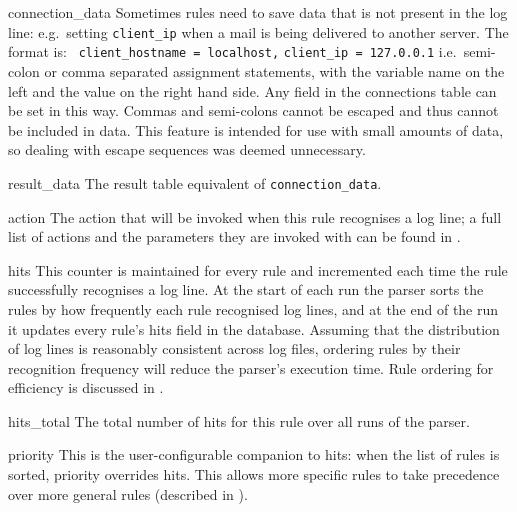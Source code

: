 \begin{boldeqlist}
    \item [connection\_data] Sometimes rules need to save data that is not
        present in the log line: e.g.\ setting \texttt{client\_ip} when a
        mail is being delivered to another server.  The format is:
        \newline{} \tab{} \texttt{ client\_hostname = localhost,}
        \newline{} \tab{} \tab{} \texttt{client\_ip = 127.0.0.1} \newline{}
        i.e.\ semi-colon or comma separated assignment statements, with the
        variable name on the left and the value on the right hand side.
        Any field in the connections table can be set in this way.  Commas
        and semi-colons cannot be escaped and thus cannot be included in
        data.  This feature is intended for use with small amounts of data,
        so dealing with escape sequences was deemed unnecessary.

    \item [result\_data] The result table equivalent of
        \texttt{connection\_data}.

    \item [action] The action that will be invoked when this rule
        recognises a log line; a full list of actions and the parameters
        they are invoked with can be found in .

    \item [hits] This counter is maintained for every rule and incremented
        each time the rule successfully recognises a log line.  At the
        start of each run the parser sorts the rules by how frequently each
        rule recognised log lines, and at the end of the run it updates
        every rule's hits field in the database.  Assuming that the
        distribution of log lines is reasonably consistent across log
        files, ordering rules by their recognition frequency will reduce
        the parser's execution time.  Rule ordering for efficiency is
        discussed in .

    \item [hits\_total] The total number of hits for this rule over all
        runs of the parser.

    \item [priority] This is the user-configurable companion to hits: when
        the list of rules is sorted, priority overrides hits.  This allows
        more specific rules to take precedence over more general rules
        (described in ).

\end{boldeqlist}

